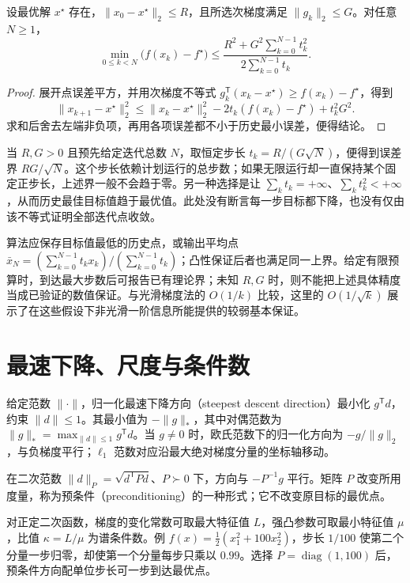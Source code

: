 \documentclass[UTF8,12pt,a4paper,fontset=fandol]{ctexbook}
\begin{document}
\begin{proposition}[有界次梯度下的最佳历史值界]
设最优解 $x^\star$ 存在，$\|x_0-x^\star\|_2\leq R$，且所选次梯度满足 $\|g_k\|_2\leq G$。对任意 $N\geq1$，
\[
 \min_{0\leq k<N}\bigl(f(x_k)-f^\star\bigr)
 \leq\frac{R^2+G^2\sum_{k=0}^{N-1}t_k^2}
              {2\sum_{k=0}^{N-1}t_k}.
\]
\end{proposition}
\begin{proof}
展开点误差平方，并用次梯度不等式
$g_k^{\mathsf T}(x_k-x^\star)\geq f(x_k)-f^\star$，得到
\[
 \|x_{k+1}-x^\star\|_2^2
 \leq\|x_k-x^\star\|_2^2
 -2t_k(f(x_k)-f^\star)+t_k^2G^2.
\]
求和后舍去左端非负项，再用各项误差都不小于历史最小误差，便得结论。
\end{proof}

当 $R,G>0$ 且预先给定迭代总数 $N$，取恒定步长 $t_k=R/(G\sqrt N)$，便得到误差界 $RG/\sqrt N$。这个步长依赖计划运行的总步数；如果无限运行却一直保持某个固定正步长，上述界一般不会趋于零。另一种选择是让 $\sum_k t_k=+\infty$、$\sum_k t_k^2<+\infty$，从而历史最佳目标值趋于最优值。此处没有断言每一步目标都下降，也没有仅由该不等式证明全部迭代点收敛。

算法应保存目标值最低的历史点，或输出平均点 $\bar x_N=(\sum_{k=0}^{N-1}t_kx_k)/(\sum_{k=0}^{N-1}t_k)$；凸性保证后者也满足同一上界。给定有限预算时，到达最大步数后可报告已有理论界；未知 $R,G$ 时，则不能把上述具体精度当成已验证的数值保证。与光滑梯度法的 $O(1/k)$ 比较，这里的 $O(1/\sqrt{k})$ 展示了在这些假设下非光滑一阶信息所能提供的较弱基本保证。

\section{最速下降、尺度与条件数}

给定范数 $\|\cdot\|$，归一化最速下降方向（steepest descent direction）最小化 $g^{\mathsf T}d$，约束 $\|d\|\leq1$。其最小值为 $-\|g\|_*$，其中对偶范数为 $\|g\|_*=\max_{\|d\|\leq1}g^{\mathsf T}d$。当 $g\ne0$ 时，欧氏范数下的归一化方向为 $-g/\|g\|_2$，与负梯度平行；$\ell_1$ 范数对应沿最大绝对梯度分量的坐标轴移动。

在二次范数 $\|d\|_P=\sqrt{d^{\mathsf T}Pd}$、$P\succ0$ 下，方向与 $-P^{-1}g$ 平行。矩阵 $P$ 改变所用度量，称为预条件（preconditioning）的一种形式；它不改变原目标的最优点。

对正定二次函数，梯度的变化常数可取最大特征值 $L$，强凸参数可取最小特征值 $\mu$，比值 $\kappa=L/\mu$ 为谱条件数。例 $f(x)=\tfrac12(x_1^2+100x_2^2)$，步长 $1/100$ 使第二个分量一步归零，却使第一个分量每步只乘以 $0.99$。选择 $P=\operatorname{diag}(1,100)$ 后，预条件方向配单位步长可一步到达最优点。
\end{document}
